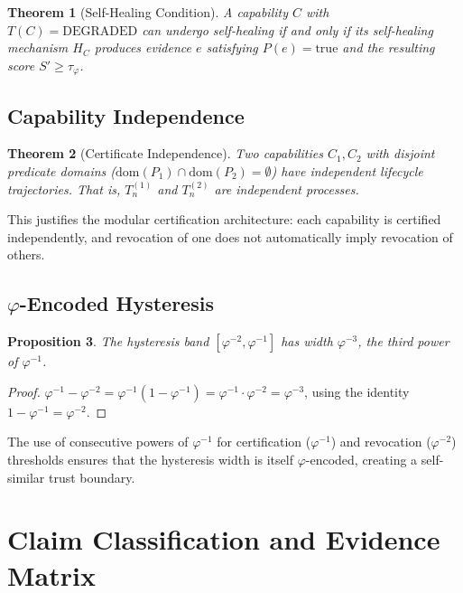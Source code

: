\documentclass[11pt,a4paper]{article}
\newtheorem{theorem}{Theorem}
\newtheorem{proposition}[theorem]{Proposition}
\begin{document}
\begin{theorem}[Self-Healing Condition]
\label{thm:heal}
A capability $C$ with $T(C) = \text{DEGRADED}$ can undergo self-healing if and only if
its self-healing mechanism $H_C$ produces evidence $e$ satisfying $P(e) = \text{true}$
and the resulting score $S' \ge \tau_\varphi$.
\end{theorem}

\subsection{Capability Independence}

\begin{theorem}[Certificate Independence]
Two capabilities $C_1, C_2$ with disjoint predicate domains ($\text{dom}(P_1) \cap
\text{dom}(P_2) = \emptyset$) have independent lifecycle trajectories.  That is,
$T_n^{(1)}$ and $T_n^{(2)}$ are independent processes.
\end{theorem}

This justifies the modular certification architecture: each capability is certified
independently, and revocation of one does not automatically imply revocation of others.

\subsection{$\varphi$-Encoded Hysteresis}

\begin{proposition}
The hysteresis band $[\varphi^{-2}, \varphi^{-1}]$ has width $\varphi^{-3}$, the third
power of $\varphi^{-1}$.
\end{proposition}

\begin{proof}
$\varphi^{-1} - \varphi^{-2} = \varphi^{-1}(1 - \varphi^{-1}) = \varphi^{-1} \cdot \varphi^{-2}
= \varphi^{-3}$, using the identity $1 - \varphi^{-1} = \varphi^{-2}$.
\end{proof}

The use of consecutive powers of $\varphi^{-1}$ for certification ($\varphi^{-1}$) and
revocation ($\varphi^{-2}$) thresholds ensures that the hysteresis width is itself
$\varphi$-encoded, creating a self-similar trust boundary.

\section{Claim Classification and Evidence Matrix}
\label{sec:evidence}
\end{document}
